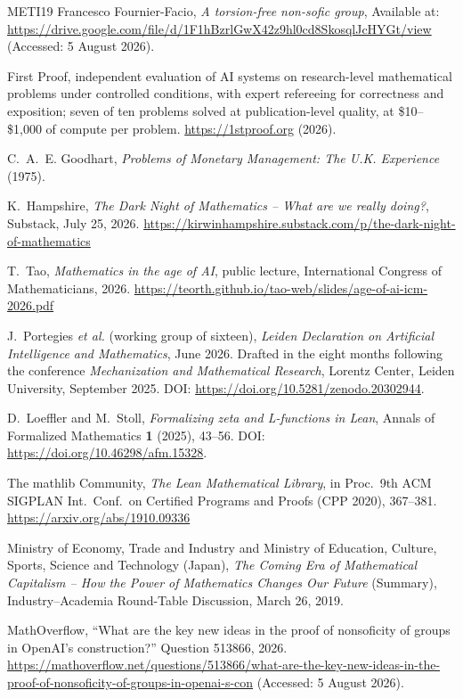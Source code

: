 \documentclass[11pt, a4paper,twosided]{amsart}
\begin{document}
\begin{thebibliography}{METI19}
  Francesco Fournier-Facio,
  \emph{A torsion-free non-sofic group},
  Available at:
  \url{https://drive.google.com/file/d/1F1hBzrlGwX42z9hl0cd8SkosqlJcHYGt/view}
  (Accessed: 5 August 2026).

  First Proof, independent evaluation of AI systems on research-level mathematical problems under controlled conditions, with expert refereeing for correctness and exposition; seven of ten problems solved at publication-level quality, at \$10--\$1{,}000 of compute per problem. \url{https://1stproof.org} (2026).

  C.~A.~E. Goodhart, \emph{Problems of Monetary Management: The U.K. Experience} (1975).
  
  K.~Hampshire, \emph{The Dark Night of Mathematics -- What are we really doing?}, Substack, July 25, 2026. \url{https://kirwinhampshire.substack.com/p/the-dark-night-of-mathematics}

  T.~Tao, \emph{Mathematics in the age of AI}, public lecture, International Congress of Mathematicians, 2026. \url{https://teorth.github.io/tao-web/slides/age-of-ai-icm-2026.pdf}

  J.~Portegies \emph{et al.} (working group of sixteen), \emph{Leiden Declaration on Artificial Intelligence and Mathematics}, June 2026. Drafted in the eight months following the conference \emph{Mechanization and Mathematical Research}, Lorentz Center, Leiden University, September 2025. DOI: \url{https://doi.org/10.5281/zenodo.20302944}.

  D.~Loeffler and M.~Stoll, \emph{Formalizing zeta and L-functions in Lean}, Annals of Formalized Mathematics \textbf{1} (2025), 43--56. DOI: \url{https://doi.org/10.46298/afm.15328}.

  The mathlib Community, \emph{The Lean Mathematical Library}, in Proc.~9th ACM SIGPLAN Int.~Conf.~on Certified Programs and Proofs (CPP 2020), 367--381. \url{https://arxiv.org/abs/1910.09336}

  Ministry of Economy, Trade and Industry and Ministry of Education, Culture, Sports, Science and Technology (Japan), \emph{The Coming Era of Mathematical Capitalism -- How the Power of Mathematics Changes Our Future} (Summary), Industry--Academia Round-Table Discussion, March 26, 2019.

  MathOverflow,
  ``What are the key new ideas in the proof of nonsoficity of groups in OpenAI's construction?''
  Question 513866,
  2026.
  \url{https://mathoverflow.net/questions/513866/what-are-the-key-new-ideas-in-the-proof-of-nonsoficity-of-groups-in-openai-s-con} (Accessed: 5 August 2026).


\end{thebibliography}
\end{document}
